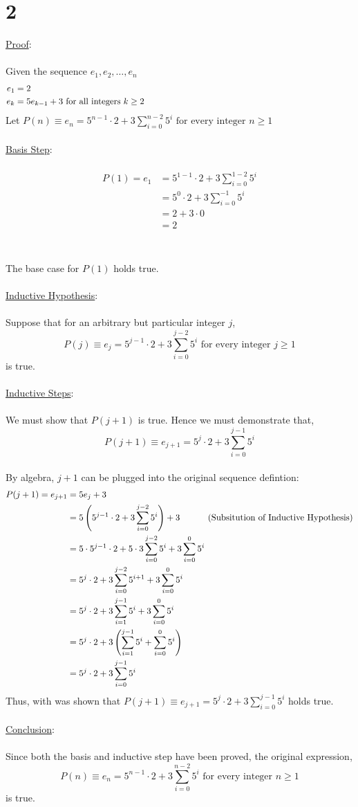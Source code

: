 \documentclass[12pt]{article}
\newcommand{\xconclusion}[1]{
    \underline{Conclusion}:
    \\ \\
    #1
    \\ \\
}
\newcommand{\xproof}{
    \underline{Proof}:
    \\ \\
}
\newcommand{\xbasistep}{
    \underline{Basis Step}:
    \\ \\
}
\newcommand{\xinductivehypothesis}{
    \underline{Inductive Hypothesis}:
    \\ \\
}
\newcommand{\xinductivesteps}{
    \underline{Inductive Steps}:
    \\ \\
}
\begin{document}
\section*{2}
\xproof
Given the sequence $e_1, e_2, \ldots, e_n$
\begin{align*}
  e_1 &= 2 \hspace*{13cm}\\
  e_k &= 5e_{k-1} + 3 \text{ for all integers } k \geq 2
\end{align*}
Let $P(n) \equiv e_n = 5^{n-1}\cdot 2 + 3\sum_{i=0}^{n-2}5^{i} \text{ for every integer }n \geq 1$
\\ \\
\xbasistep
\begin{align*}
  P(1) = e_1 &= 5^{1-1}\cdot 2 + 3\sum_{i=0}^{1-2}5^{i} \\
  &= 5^0 \cdot 2 + 3 \sum _{i=0}^{-1}5^{i} \\
  &= 2 + 3\cdot 0 \\
  &= 2 \\
\end{align*}
\newblock
\\ \\
The base case for $P(1)$ holds true.
\\ \\
\xinductivehypothesis
Suppose that for an arbitrary but particular integer $j$, \\
$$ P(j) \equiv e_j = 5^{j-1}\cdot 2 + 3\sum_{i=0}^{j-2}5^{i} \text{ for every integer }j \geq 1$$
is true.
\\ \\
\xinductivesteps
We must show that $P(j+1)$ is true. Hence we must demonstrate that,
$$ P(j+1) \equiv e_{j+1} = 5^{j}\cdot 2 + 3\sum_{i=0}^{j-1}5^{i} $$
\\
By algebra, $j+1$ can be plugged into the original sequence defintion:
\begin{align*}
  P(j+1) = e_{j+1} &= 5e_j+3 \\
  &= 5\left(5^{j-1}\cdot 2 + 3\sum_{i=0}^{j-2}5^{i}\right) + 3  \text{ \hspace*{1cm}(Subsitution of Inductive Hypothesis)}\\
  &= 5\cdot5^{j-1}\cdot 2 + 5\cdot 3\sum_{i=0}^{j-2}5^{i} + 3\sum_{i=0}^{0}5^i \\ 
  &= 5^j\cdot 2 + 3\sum_{i=0}^{j-2}5^{i+1} + 3\sum_{i=0}^{0}5^i \\ 
  &= 5^j\cdot 2 + 3\sum_{i=1}^{j-1}5^{i} + 3\sum_{i=0}^{0}5^i \\ 
  &= 5^j\cdot 2 + 3\left(\sum_{i=1}^{j-1}5^{i} + \sum_{i=0}^{0}5^i\right) \\ 
  &= 5^j\cdot 2 + 3\sum_{i=0}^{j-1}5^{i} \\ 
\end{align*}
\newblock
Thus, with was shown that $P(j+1) \equiv e_{j+1} = 5^{j}\cdot 2 + 3\sum_{i=0}^{j-1}5^{i}$ holds true.
\\ \\
\xconclusion{
Since both the basis and inductive step have been proved, the original expression, 
$$P(n) \equiv e_n = 5^{n-1}\cdot 2 + 3\sum_{i=0}^{n-2}5^{i} \text{ for every integer }n \geq 1$$
is true.
}
\end{document}
